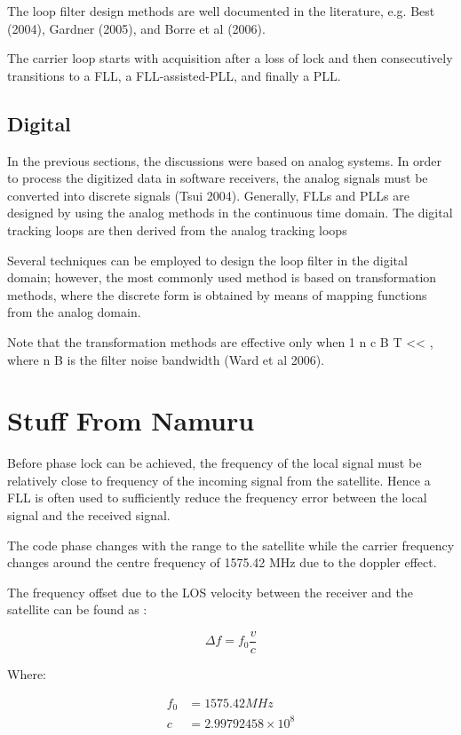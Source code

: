 The loop filter design methods are well documented in the literature, e.g. Best
(2004), Gardner (2005), and Borre et al (2006).

The carrier loop starts with acquisition after a
loss of lock and then consecutively transitions to a FLL, a FLL-assisted-PLL, and finally
a PLL.

\subsection{Digital}


In the previous sections, the discussions were based on analog systems. In order to
process the digitized data in software receivers, the analog signals must be converted into
discrete signals (Tsui 2004). Generally, FLLs and PLLs are designed by using the analog
methods in the continuous time domain. The digital tracking loops are then derived from
the analog tracking loops


Several techniques can be employed to design the loop filter in
the digital domain; however, the most commonly used method is based on transformation
methods, where the discrete form is obtained by means of mapping functions from the
analog domain.

Note that the transformation methods are effective only when 1 n c B T << , where n B is the
filter noise bandwidth (Ward et al 2006).

\section{Stuff From Namuru}
Before phase lock can be achieved, the frequency of the local signal must be relatively close to frequency of the incoming signal from the satellite. Hence a \ac{FLL} is often used to sufficiently reduce the frequency error between the local signal and the received signal.

The code phase changes with the range to the satellite while the carrier frequency changes around the centre frequency of 1575.42 MHz due to the doppler effect\cite{Tsui}.

The frequency offset due to the \ac{LOS} velocity between the receiver and the satellite can be found as : 

\begin{equation}
\Delta f = f_0\frac{v}{c}
\end{equation}

Where: 
\begin{framed}
\begin{align*}
f_0 &= 1575.42 MHz\\   
c &= 2.99792458 \times 10^8
\end{align*}
\end{framed}

